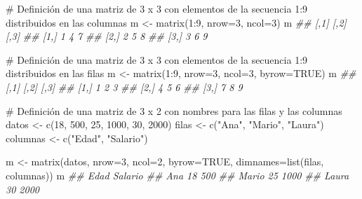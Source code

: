 \documentclass[
  letterpaper,
  DIV=11,
  numbers=noendperiod]{scrreprt}
\newenvironment{Shaded}{\begin{snugshade}}{\end{snugshade}}
\newcommand{\AttributeTok}[1]{\textcolor[rgb]{0.40,0.45,0.13}{#1}}
\newcommand{\CommentTok}[1]{\textcolor[rgb]{0.37,0.37,0.37}{#1}}
\newcommand{\ConstantTok}[1]{\textcolor[rgb]{0.56,0.35,0.01}{#1}}
\newcommand{\DecValTok}[1]{\textcolor[rgb]{0.68,0.00,0.00}{#1}}
\newcommand{\DocumentationTok}[1]{\textcolor[rgb]{0.37,0.37,0.37}{\textit{#1}}}
\newcommand{\FunctionTok}[1]{\textcolor[rgb]{0.28,0.35,0.67}{#1}}
\newcommand{\NormalTok}[1]{\textcolor[rgb]{0.00,0.23,0.31}{#1}}
\newcommand{\OtherTok}[1]{\textcolor[rgb]{0.00,0.23,0.31}{#1}}
\newcommand{\SpecialCharTok}[1]{\textcolor[rgb]{0.37,0.37,0.37}{#1}}
\newcommand{\StringTok}[1]{\textcolor[rgb]{0.13,0.47,0.30}{#1}}
\begin{document}
\begin{Shaded}
\begin{Highlighting}[]
\CommentTok{\# Definición de una matriz de 3 x 3 con elementos de la secuencia 1:9 distribuidos en las columnas}
\NormalTok{m }\OtherTok{\textless{}{-}} \FunctionTok{matrix}\NormalTok{(}\DecValTok{1}\SpecialCharTok{:}\DecValTok{9}\NormalTok{, }\AttributeTok{nrow=}\DecValTok{3}\NormalTok{, }\AttributeTok{ncol=}\DecValTok{3}\NormalTok{)}
\NormalTok{m}
\DocumentationTok{\#\#      [,1] [,2] [,3]}
\DocumentationTok{\#\# [1,]    1    4    7}
\DocumentationTok{\#\# [2,]    2    5    8}
\DocumentationTok{\#\# [3,]    3    6    9}

\CommentTok{\# Definición de una matriz de 3 x 3 con elementos de la secuencia 1:9 distribuidos en las filas}
\NormalTok{m }\OtherTok{\textless{}{-}} \FunctionTok{matrix}\NormalTok{(}\DecValTok{1}\SpecialCharTok{:}\DecValTok{9}\NormalTok{, }\AttributeTok{nrow=}\DecValTok{3}\NormalTok{, }\AttributeTok{ncol=}\DecValTok{3}\NormalTok{, }\AttributeTok{byrow=}\ConstantTok{TRUE}\NormalTok{)}
\NormalTok{m}
\DocumentationTok{\#\#      [,1] [,2] [,3]}
\DocumentationTok{\#\# [1,]    1    2    3}
\DocumentationTok{\#\# [2,]    4    5    6}
\DocumentationTok{\#\# [3,]    7    8    9}

\CommentTok{\# Definición de una matriz de 3 x 2 con nombres para las filas y las columnas}
\NormalTok{datos }\OtherTok{\textless{}{-}} \FunctionTok{c}\NormalTok{(}\DecValTok{18}\NormalTok{, }\DecValTok{500}\NormalTok{, }\DecValTok{25}\NormalTok{, }\DecValTok{1000}\NormalTok{, }\DecValTok{30}\NormalTok{, }\DecValTok{2000}\NormalTok{)}
\NormalTok{filas }\OtherTok{\textless{}{-}} \FunctionTok{c}\NormalTok{(}\StringTok{"Ana"}\NormalTok{, }\StringTok{"Mario"}\NormalTok{, }\StringTok{"Laura"}\NormalTok{)}
\NormalTok{columnas }\OtherTok{\textless{}{-}} \FunctionTok{c}\NormalTok{(}\StringTok{"Edad"}\NormalTok{, }\StringTok{"Salario"}\NormalTok{)}

\NormalTok{m }\OtherTok{\textless{}{-}} \FunctionTok{matrix}\NormalTok{(datos, }\AttributeTok{nrow=}\DecValTok{3}\NormalTok{, }\AttributeTok{ncol=}\DecValTok{2}\NormalTok{, }\AttributeTok{byrow=}\ConstantTok{TRUE}\NormalTok{, }\AttributeTok{dimnames=}\FunctionTok{list}\NormalTok{(filas, columnas))}
\NormalTok{m}
\DocumentationTok{\#\#       Edad Salario}
\DocumentationTok{\#\# Ana     18     500}
\DocumentationTok{\#\# Mario   25    1000}
\DocumentationTok{\#\# Laura   30    2000}
\end{Highlighting}
\end{Shaded}
\end{document}

